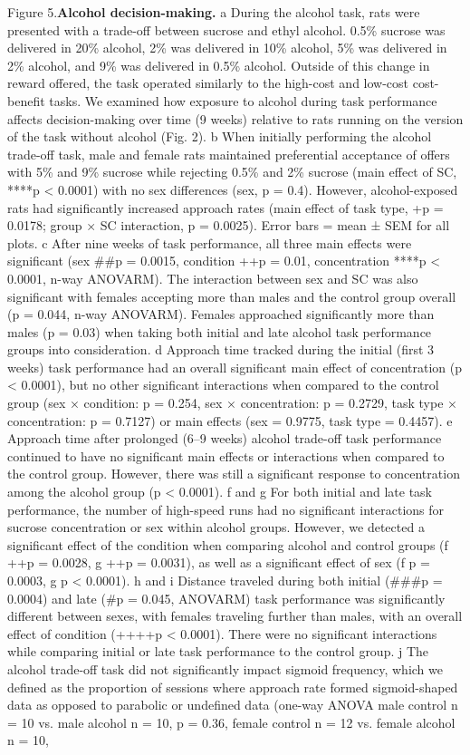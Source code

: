 \documentclass{article}
\begin{document}
\begin{singlespace}
    \noindent Figure 5.\textbf{Alcohol decision-making.} a During the alcohol task, rats were presented with a trade-off between sucrose and ethyl alcohol. 0.5\% sucrose was delivered in 20\% alcohol, 2\% was delivered in 10\% alcohol, 5\% was delivered in 2\% alcohol, and 9\% was delivered in 0.5\% alcohol. Outside of this change in reward offered, the task operated similarly to the high-cost and low-cost cost-benefit tasks. We examined how exposure to alcohol during task performance affects decision-making over time (9 weeks) relative to rats running on the version of the task without alcohol (Fig. 2). b When initially performing the alcohol trade-off task, male and female rats maintained preferential acceptance of offers with 5\% and 9\% sucrose while rejecting 0.5\% and 2\% sucrose (main effect of SC, ****p < 0.0001) with no sex differences (sex, p = 0.4). However, alcohol-exposed rats had significantly increased approach rates (main effect of task type, +p = 0.0178; group × SC interaction, p = 0.0025). Error bars = mean ± SEM for all plots. c After nine weeks of task performance, all three main effects were significant (sex \#\#p = 0.0015, condition ++p = 0.01, concentration ****p < 0.0001, n-way ANOVARM). The interaction between sex and SC was also significant with females accepting more than males and the control group overall (p = 0.044, n-way ANOVARM). Females approached significantly more than males (p = 0.03) when taking both initial and late alcohol task performance groups into consideration. d Approach time tracked during the initial (first 3 weeks) task performance had an overall significant main effect of concentration (p < 0.0001), but no other significant interactions when compared to the control group (sex × condition: p = 0.254, sex × concentration: p = 0.2729, task type × concentration: p = 0.7127) or main effects (sex = 0.9775, task type = 0.4457). e Approach time after prolonged (6–9 weeks) alcohol trade-off task performance continued to have no significant main effects or interactions when compared to the control group. However, there was still a significant response to concentration among the alcohol group (p < 0.0001). f and g For both initial and late task performance, the number of high-speed runs had no significant interactions for sucrose concentration or sex within alcohol groups. However, we detected a significant effect of the condition when comparing alcohol and control groups (f ++p = 0.0028, g ++p = 0.0031), as well as a significant effect of sex (f p = 0.0003, g p < 0.0001). h and i Distance traveled during both initial (\#\#\#p = 0.0004) and late (\#p = 0.045, ANOVARM) task performance was significantly different between sexes, with females traveling further than males, with an overall effect of condition (++++p < 0.0001). There were no significant interactions while comparing initial or late task performance to the control group. j The alcohol trade-off task did not significantly impact sigmoid frequency, which we defined as the proportion of sessions where approach rate formed sigmoid-shaped data as opposed to parabolic or undefined data (one-way ANOVA male control n = 10 vs. male alcohol n = 10, p = 0.36, female control n = 12 vs. female alcohol n = 10, 
\end{singlespace}
\end{document}
